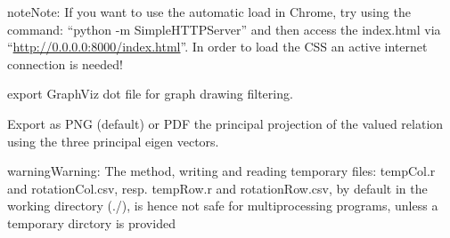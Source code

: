\documentclass[letterpaper,10pt,english]{sphinxmanual}
\begin{document}
\begin{fulllineitems}
\begin{fulllineitems}
\begin{description}
\begin{enumerate}
\begin{description}
\end{description}

\end{enumerate}

\end{description}

\begin{notice}{note}{Note:}
If you want to use the automatic load in Chrome, try using the command: ``python -m SimpleHTTPServer''
and then access the index.html via ``\href{http://0.0.0.0:8000/index.html}{http://0.0.0.0:8000/index.html}''.
In order to load the CSS an active internet connection is needed!
\end{notice}

\end{fulllineitems}


\begin{fulllineitems}
\label{techDoc:digraphs.Digraph.exportGraphViz}
export GraphViz dot file  for graph drawing filtering.

\end{fulllineitems}


\begin{fulllineitems}
\label{techDoc:digraphs.Digraph.exportPrincipalImage}
Export as PNG (default) or PDF the principal projection of
the valued relation using the three principal eigen vectors.

\begin{notice}{warning}{Warning:}
The method, writing and reading temporary files: 
tempCol.r and rotationCol.csv, resp. tempRow.r and rotationRow.csv,
by default in the working directory (./),
is hence not safe for multiprocessing programs, unless a
temporary dirctory is provided
\end{notice}

\end{fulllineitems}



\end{fulllineitems}
\end{document}
